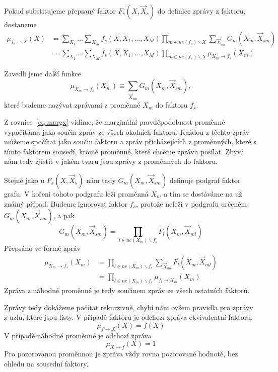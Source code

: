 Pokud substitujeme přepsaný faktor $F_s(X, \vec{X}_s)$ do definice zprávy z faktoru, dostaneme
\begin{align}
\mu_{f_s \rightarrow X}(X) &=
    \sum_{X_1} \dots \sum_{X_M}
        f_s(X, X_1, \dots, X_M)
        \prod_{m \in ne(f_s) \backslash X}
            \sum_{\vec{X}_{sm}}
                G_m(X_m, \vec{X}_{sm})
\\
&= \sum_{X_1} \dots \sum_{X_M}
    f_s(X, X_1, \dots, X_M)
    \prod_{m \in ne(f_s) \backslash X}
        \mu_{X_m \rightarrow f_s}(X_m)
\label{eq:mfsx}
\end{align}

Zavedli jsme další funkce 
\begin{equation}
    \mu_{X_m \rightarrow f_s}(X_m) \equiv \sum_{\vec{X}_{sm}} G_m(X_m, \vec{X}_{sm}),
\label{eq:defmsgxf}
\end{equation}
které budeme nazývat zprávami z proměnné $X_m$ do faktoru $f_s$.

Z rovnice~\ref{eq:margx} vidíme, že marginální pravděpodobnost proměnné vypočítáma jako součin zpráv ze všech okolních faktorů.
Každou z těchto zpráv můžeme spočítat jako součin faktoru a zpráv přicházejících z proměnných, které s tímto faktorem sousedí, kromě proměnné, které chceme zprávu posílat. Zbývá nám tedy zjistit v jakém tvaru jsou zprávy z proměnných do faktoru.

Stejně jako u $F_s(X, \vec{X}_s)$ nám tady $G_m(X_m, \vec{X}_{sm})$ definuje podgraf faktor grafu. 
V kořeni tohoto podgrafu leží proměnná $X_m$ a tím se dostáváme na už známý případ.
Budeme ignorovat faktor $f_s$, protože neleží v podgrafu určeném $G_m(X_m, \vec{X}_{sm})$, a pak 
\begin{equation}
    G_m(X_m, \vec{X}_{sm}) = \prod_{l \in ne(X_m) \backslash f_s} F_l(X_m, \vec{X}_{ml})
\end{equation}
Přepsáno ve formě zpráv
\begin{align}
\mu_{X_m \rightarrow f_s}(X_m)
&= \prod_{l \in ne(X_m) \backslash f_s}
    \sum_{\vec{X}_{ml}}
        F_l(X_m, \vec{X}_{ml})
\\
&= \prod_{l \in ne(X_m) \backslash f_s}
    \mu_{f_l \rightarrow X_m}(X_m)
\end{align}
Zpráva z náhodné proměnné je tedy součinem zpráv ze všech ostatních faktorů.

Zprávy tedy dokážeme počítat rekurzivně, chybí nám ovšem pravidla pro zprávy z uzlů, které jsou listy.
V případě faktoru je odchozí zpráva ekvivalentní faktoru.
\begin{equation}
    \mu_{f \rightarrow X}(X) = f(X)
\end{equation}
V případě náhodné proměnné je odchozí zpráva 
\begin{equation}
    \mu_{X \rightarrow f}(X) = 1
\end{equation}
Pro pozorovanou proměnnou je zpráva vždy rovna pozorované hodnotě, bez ohledu na sousední faktory.

